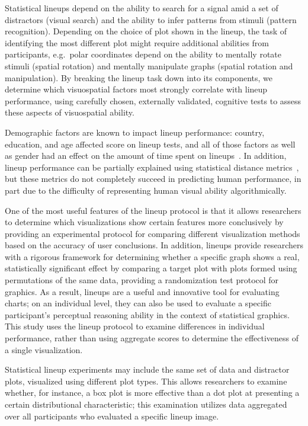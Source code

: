 \documentclass[journal]{vgtc}\usepackage[]{graphicx}\usepackage[]{color}
\begin{document}
Statistical lineups depend on the ability to search for a signal amid a set of distractors (visual search) and the ability to infer patterns from stimuli (pattern recognition). Depending on the choice of plot shown in the lineup, the task of identifying the most different plot might require additional abilities from participants, e.g.~polar coordinates depend on the ability to mentally rotate stimuli (spatial rotation) and mentally manipulate graphs (spatial rotation and manipulation). By breaking the lineup task down into its components, we  determine which visuospatial factors most strongly correlate with lineup performance, using carefully chosen, externally validated, cognitive tests to assess these aspects of visuospatial ability. 

Demographic factors are known to impact lineup performance: country, education, and age affected score on lineup tests, and all of those factors as well as gender had an effect on the amount of time spent on lineups~\cite{humanfactorslineups}. In addition, lineup performance can be partially explained using statistical distance metrics~\cite{distancemetriclineups}, but these metrics do not completely succeed in predicting human performance, in part due to the difficulty of representing human visual ability algorithmically.

One of the most useful features of the lineup protocol is that it allows researchers to determine which visualizations show certain features more conclusively by providing an experimental protocol for comparing different visualization methods based on the accuracy of user conclusions. In addition, lineups provide researchers with a rigorous framework for determining whether a specific graph shows a real, statistically significant effect by comparing a target plot with plots formed using permutations of the same data, providing a randomization test protocol for graphics. As a result, lineups are a useful and innovative tool for evaluating charts; on an individual level, they can also be used to evaluate a specific participant's perceptual reasoning ability in the context of statistical graphics.
This study uses the lineup protocol to examine differences in individual performance, rather than using aggregate scores to determine the effectiveness of a single visualization. 

Statistical lineup experiments may include the same set of data and distractor plots, visualized using different plot types. This allows researchers to examine whether, for instance, a box plot is more effective than a dot plot at presenting a certain distributional characteristic; this examination utilizes data aggregated over all participants who evaluated a specific lineup image. 
\end{document}
